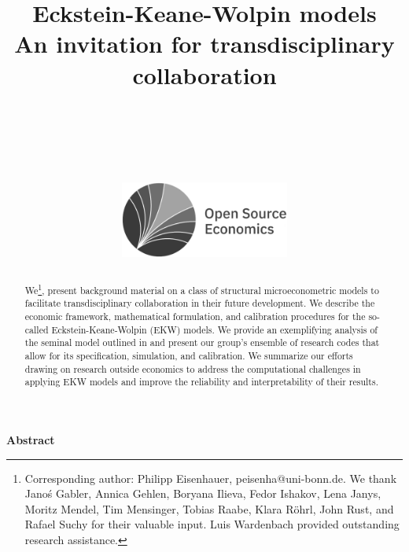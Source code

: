 
\title{Eckstein-Keane-Wolpin models\\
	\large An invitation for transdisciplinary collaboration\vspace{0.25cm}\\
	\\
	\\
	\\
	\includegraphics[height=2.5cm]{../material/crop-ose-logo-black-white.pdf}
}

\vspace{2.5cm}
\renewcommand{\baselinestretch}{1.3}\normalsize

\setcounter{page}{1}
\thispagestyle{empty}

\begin{center}\textbf{Abstract}\end{center}
\begin{abstract}
\noindent We\footnote{Corresponding author: Philipp Eisenhauer, peisenha@uni-bonn.de. We thank  Jano\'s Gabler, Annica Gehlen, Boryana Ilieva, Fedor Ishakov, Lena Janys, Moritz Mendel, Tim Mensinger, Tobias Raabe, Klara R\"ohrl, John Rust, and Rafael Suchy for their valuable input. Luis Wardenbach provided outstanding research assistance.}‚ present background material on a class of structural microeconometric models to facilitate transdisciplinary collaboration in their future development. We describe the economic framework, mathematical formulation, and calibration procedures for the so-called Eckstein-Keane-Wolpin (EKW) models. We provide an exemplifying analysis of the seminal model outlined in \citet{Keane.1997} and present our group's ensemble of research codes that allow for its specification, simulation, and calibration. We summarize our efforts drawing on research outside economics to
address the computational challenges in applying EKW models and improve the reliability and interpretability of their results.
\end{abstract}


\setcounter{page}{1}
\thispagestyle{empty}

\newpage
\tableofcontents
\newpage
